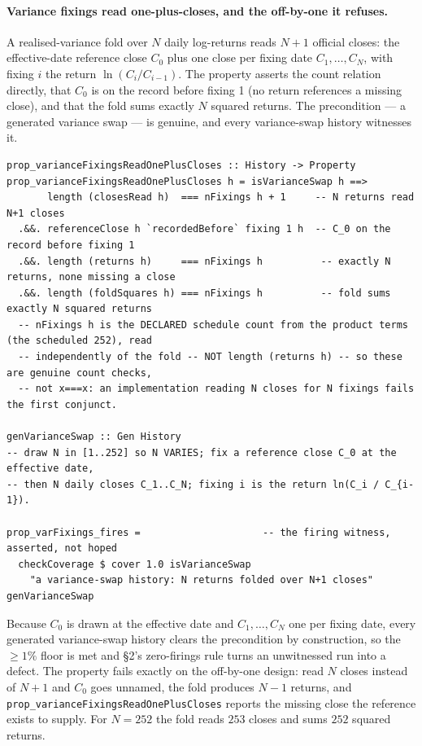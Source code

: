 \paragraph{Variance fixings read one-plus-closes, and the off-by-one it refuses.}
A realised-variance fold over $N$ daily log-returns reads $N+1$ official closes:
the effective-date reference close $C_0$ plus one close per fixing date
$C_1,\dots,C_{N}$, with fixing $i$ the return $\ln(C_i/C_{i-1})$. The property
asserts the count relation directly, that $C_0$ is on the record before fixing 1
(no return references a missing close), and that the fold sums exactly $N$ squared
returns. The precondition --- a generated variance swap --- is genuine, and every
variance-swap history witnesses it.

\begin{lstlisting}
prop_varianceFixingsReadOnePlusCloses :: History -> Property
prop_varianceFixingsReadOnePlusCloses h = isVarianceSwap h ==>
       length (closesRead h)  === nFixings h + 1     -- N returns read N+1 closes
  .&&. referenceClose h `recordedBefore` fixing 1 h  -- C_0 on the record before fixing 1
  .&&. length (returns h)     === nFixings h          -- exactly N returns, none missing a close
  .&&. length (foldSquares h) === nFixings h          -- fold sums exactly N squared returns
  -- nFixings h is the DECLARED schedule count from the product terms (the scheduled 252), read
  -- independently of the fold -- NOT length (returns h) -- so these are genuine count checks,
  -- not x===x: an implementation reading N closes for N fixings fails the first conjunct.

genVarianceSwap :: Gen History
-- draw N in [1..252] so N VARIES; fix a reference close C_0 at the effective date,
-- then N daily closes C_1..C_N; fixing i is the return ln(C_i / C_{i-1}).

prop_varFixings_fires =                     -- the firing witness, asserted, not hoped
  checkCoverage $ cover 1.0 isVarianceSwap
    "a variance-swap history: N returns folded over N+1 closes" genVarianceSwap
\end{lstlisting}

Because $C_0$ is drawn at the effective date and $C_1,\dots,C_N$ one per fixing
date, every generated variance-swap history clears the precondition by construction,
so the $\ge 1\%$ floor is met and \S 2's zero-firings rule turns an unwitnessed run
into a defect. The property fails exactly on the off-by-one design: read $N$ closes
instead of $N+1$ and $C_0$ goes unnamed, the fold produces $N-1$ returns, and
\texttt{prop\_varianceFixingsReadOnePlusCloses} reports the missing close the
reference exists to supply. For $N = 252$ the fold reads $253$ closes and sums $252$
squared returns.

